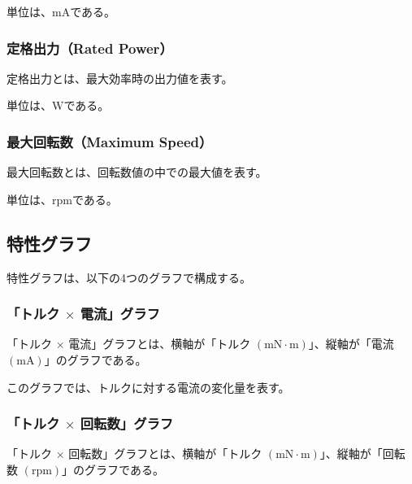 単位は、$\mathrm{mA}$である。
\subsubsection{定格出力（Rated Power）}\label{sub:sub:teikakusyutu}
定格出力とは、最大効率時の出力値を表す。

単位は、$\mathrm{W}$である。
\subsubsection{最大回転数（Maximum Speed）}\label{sub:sub:saidaikai}
最大回転数とは、回転数値の中での最大値を表す。

単位は、$\mathrm{rpm}$である。
\subsection{特性グラフ}\label{sub:tokuseigurahu}
特性グラフは、以下の4つのグラフで構成する。
\subsubsection{「トルク $\times$ 電流」グラフ}\label{sub:sub:torden}
「トルク $\times$ 電流」グラフとは、横軸が「トルク $(\mathrm{mN \cdot m})$」、縦軸が「電流 $(\mathrm{mA})$」のグラフである。

このグラフでは、トルクに対する電流の変化量を表す。
\subsubsection{「トルク $\times$ 回転数」グラフ}\label{sub:sub:torkaiten}
「トルク $\times$ 回転数」グラフとは、横軸が「トルク $(\mathrm{mN \cdot m})$」、縦軸が「回転数 $(\mathrm{rpm})$」のグラフである。


